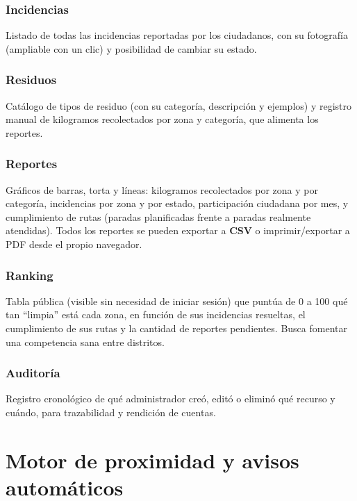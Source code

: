 \documentclass[11pt,a4paper]{article}
\begin{document}
\subsubsection{Incidencias}
Listado de todas las incidencias reportadas por los ciudadanos, con su fotografía (ampliable con un clic) y posibilidad de cambiar su estado.

\subsubsection{Residuos}
Catálogo de tipos de residuo (con su categoría, descripción y ejemplos) y registro manual de kilogramos recolectados por zona y categoría, que alimenta los reportes.

\subsubsection{Reportes}
Gráficos de barras, torta y líneas: kilogramos recolectados por zona y por categoría, incidencias por zona y por estado, participación ciudadana por mes, y cumplimiento de rutas (paradas planificadas frente a paradas realmente atendidas). Todos los reportes se pueden exportar a \textbf{CSV} o imprimir/exportar a PDF desde el propio navegador.

\subsubsection{Ranking}
Tabla pública (visible sin necesidad de iniciar sesión) que puntúa de 0 a 100 qué tan ``limpia'' está cada zona, en función de sus incidencias resueltas, el cumplimiento de sus rutas y la cantidad de reportes pendientes. Busca fomentar una competencia sana entre distritos.

\subsubsection{Auditoría}
Registro cronológico de qué administrador creó, editó o eliminó qué recurso y cuándo, para trazabilidad y rendición de cuentas.

\section{Motor de proximidad y avisos automáticos}
\label{sec:proximidad}
\end{document}
